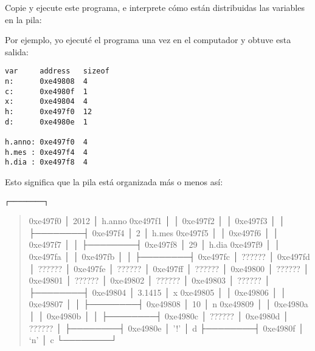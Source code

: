 Copie y ejecute este programa, e interprete cómo están distribuidas las
variables en la pila:

Por ejemplo, yo ejecuté el programa una vez en el computador y obtuve
esta salida:

\begin{lstlisting}
var     address   sizeof
n:      0xe49808  4
c:      0xe4980f  1
x:      0xe49804  4
h:      0xe497f0  12
d:      0xe4980e  1

h.anno: 0xe497f0  4
h.mes : 0xe497f4  4
h.dia : 0xe497f8  4
\end{lstlisting}

Esto significa que la pila está organizada más o menos así:

\begin{lstlisting}
┌────────┐
\end{lstlisting}

\begin{quote}
0xe497f0 │ 2012 │ h.anno 0xe497f1 │ │ 0xe497f2 │ │ 0xe497f3 │ │
├────────┤ 0xe497f4 │ 2 │ h.mes 0xe497f5 │ │ 0xe497f6 │ │ 0xe497f7 │ │
├────────┤ 0xe497f8 │ 29 │ h.dia 0xe497f9 │ │ 0xe497fa │ │ 0xe497fb │ │
├────────┤ 0xe497fc │ ?????? │ 0xe497fd │ ?????? │ 0xe497fe │ ?????? │
0xe497ff │ ?????? │ 0xe49800 │ ?????? │ 0xe49801 │ ?????? │ 0xe49802 │
?????? │ 0xe49803 │ ?????? │ ├────────┤ 0xe49804 │ 3.1415 │ x 0xe49805 │
│ 0xe49806 │ │ 0xe49807 │ │ ├────────┤ 0xe49808 │ 10 │ n 0xe49809 │ │
0xe4980a │ │ 0xe4980b │ │ ├────────┤ 0xe4980c │ ?????? │ 0xe4980d │
?????? │ ├────────┤ 0xe4980e │ '!' │ d ├────────┤ 0xe4980f │ `n' │ c
└────────┘
\end{quote}

